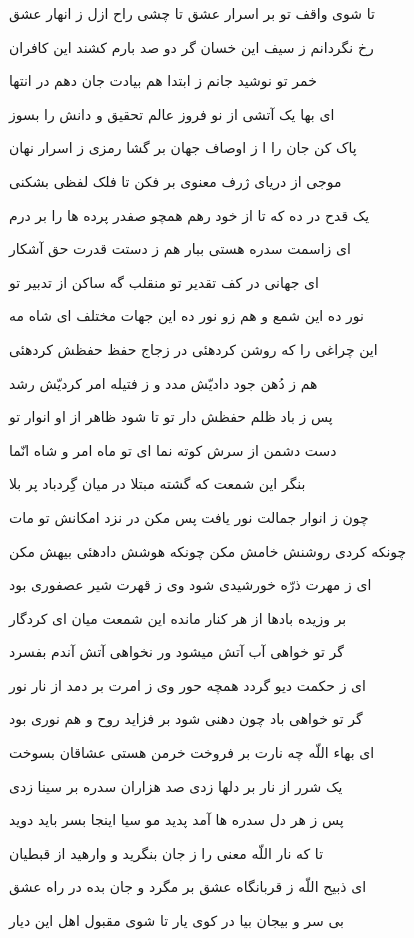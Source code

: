 تا شوى واقف تو بر اسرار عشق
تا چشى راح ازل ز انهار عشق

رخ نگردانم ز سيف اين خسان
گر دو صد بارم کشند اين کافران

خمر تو نوشيد جانم ز ابتدا
هم بيادت جان دهم در انتها

اى بها يک آتشى از نو فروز
عالم تحقيق و دانش را بسوز

پاک کن جان را ا ز اوصاف جهان
بر گشا رمزى ز اسرار نهان

موجى از درياى ژرف معنوى
بر فکن تا فلک لفظى بشکنى

يک قدح در ده که تا از خود رهم
همچو صفدر پرده ها را بر درم

اى زاسمت سدره هستى ببار
هم ز دستت قدرت حق آشکار

اى جهانى در کف تقدير تو
منقلب گه ساکن از تدبير تو

نور ده اين شمع و هم زو نور ده
اين جهات مختلف اى شاه مه

اين چراغى را که روشن کرده‍ئى
در زجاج حفظ حفظش کردهئى

هم ز دُهن جود داديّش مدد
و ز فتيله امر کرديّش رشد

پس ز باد ظلم حفظش دار تو
تا شود ظاهر از او انوار تو

دست دشمن از سرش کوته نما
اى تو ماه امر و شاه انّما

بنگر اين شمعت که گشته مبتلا
در ميان گِردباد پر بلا

چون ز انوار جمالت نور يافت
پس مکن در نزد امکانش تو مات

چونکه کردى روشنش خامش مکن
چونکه هوشش دادهئى بيهش مکن

اى ز مهرت ذرّه خورشيدى شود
وى ز قهرت شير عصفورى بود

بر وزيده بادها از هر کنار
مانده اين شمعت ميان اى کردگار

گر تو خواهى آب آتش ميشود
ور نخواهى آتش آندم بفسرد

اى ز حکمت ديو گردد همچه حور
وى ز امرت بر دمد از نار نور

گر تو خواهى باد چون دهنى شود
بر فزايد روح و هم نورى بود

اى بهاء اللّه چه نارت بر فروخت
خرمن هستى عشاقان بسوخت

يک شرر از نار بر دلها زدى
صد هزاران سدره بر سينا زدى

پس ز هر دل سدره ها آمد پديد
مو سيا اينجا بسر بايد دويد

تا که نار اللّه معنى را ز جان
بنگريد و وارهيد از قبطيان

اى ذبيح اللّه ز قربانگاه عشق
بر مگرد و جان بده در راه عشق

بى سر و بيجان بيا در کوى يار
تا شوى مقبول اهل اين ديار

